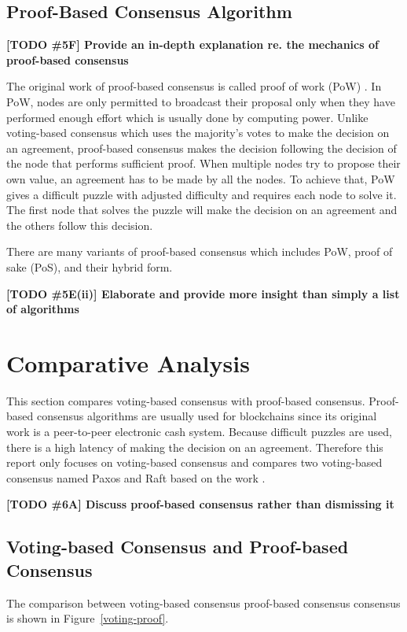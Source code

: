 \documentclass[12pt, a4paper]{article}
\newcommand{\todo}[2]{\textbf{\color{blue}[TODO \##1] #2}\par}
\begin{document}
\subsection{Proof-Based Consensus Algorithm}
\todo{5F}{Provide an in-depth explanation re. the mechanics of proof-based consensus}
The original work of proof-based consensus is called proof of work (PoW)
\cite{nakamoto2019bitcoin}. In PoW, nodes are only permitted to
broadcast their proposal only when they have performed enough effort which
is usually done by computing power.
Unlike voting-based consensus which uses the majority's votes to
make the decision on an agreement, proof-based consensus makes the decision
following the decision of the node that performs sufficient proof.
When multiple nodes try to propose their own value, an agreement has to be made
by all the nodes. To achieve that, PoW gives a difficult puzzle with adjusted difficulty
and requires each node to solve it. The first node that solves the puzzle will make the
decision on an agreement and the others follow this decision.

There are many variants of proof-based consensus
which includes PoW, proof of sake (PoS), and their hybrid form.

\todo{5E(ii)}{Elaborate and provide more insight than simply a list of algorithms}


\section{Comparative Analysis}
\label{sec:comparitive}

This section compares voting-based consensus with proof-based consensus.
Proof-based consensus algorithms are usually used for blockchains since its
original work is a peer-to-peer electronic cash system.
Because difficult puzzles are used,
there is a high latency of making the decision on an agreement.
Therefore this report only focuses on voting-based consensus and
compares two voting-based consensus named Paxos and Raft
based on the work \cite{howard2020paxos}.

\todo{6A}{Discuss proof-based consensus rather than dismissing it}

\subsection{Voting-based Consensus and Proof-based Consensus}
The comparison between voting-based consensus proof-based consensus consensus
is shown in Figure~\ref{voting-proof}.
\end{document}
